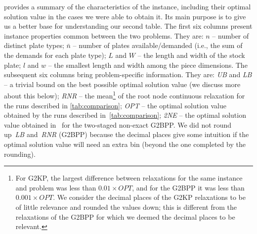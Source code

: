 \documentclass[9pt]{entcs}
\begin{document}
 provides a summary of the characteristics of the instance, including their optimal solution value in the cases we were able to obtain it.
Its main purpose is to give us a better base for understanding our second table.
The first six columns present instance properties common between the two problems.
They are:
\(n\) -- number of distinct plate types;
\(\bar{n}\) -- number of plates available/demanded (i.e., the sum of the demands for each plate type);
\(L\) and \(W\) -- the length and width of the stock plate;
\underline{\(l\)} and \underline{\(w\)} -- the smallest length and width among the piece dimensions.
The subsequent six columns bring problem-specific information.
They are:
\emph{UB} and \emph{LB} -- a trivial bound on the best possible optimal solution value (we discuss more about this below);
\emph{RNR} -- the mean\footnote{
	For G2KP, the largest difference between relaxations for the same instance and problem was less than \(0.01 \times OPT\), and for the G2BPP it was less than \(0.001 \times OPT\).
	We consider the decimal places of the G2KP relaxations to be of little relevance and rounded the values down; this is different from the relaxations of the G2BPP for which we deemed the decimal places to be relevant.
} of the root node continuous relaxation for the runs described in \cref{tab:comparison};
\emph{OPT} -- the optimal solution value obtained by the runs described in~\cref{tab:comparison};
\emph{2NE} -- the optimal solution value obtained in~\cite{silva:2010} for the two-staged non-exact G2BPP.
We did not round up~\emph{LB} and~\emph{RNR} (G2BPP) because the decimal places give some intuition if the optimal solution value will need an extra bin (beyond the one completed by the rounding).
\end{document}
